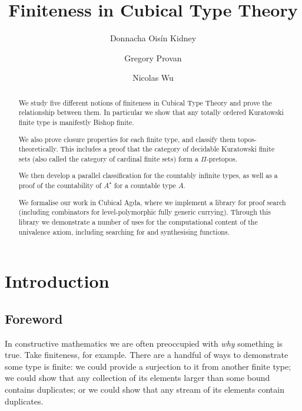 

\author{Donnacha Oisín Kidney}
\author{Gregory Provan}
\author{Nicolas Wu}

\title{Finiteness in Cubical Type Theory}


\begin{abstract}
  We study five different notions of finiteness in Cubical Type Theory and prove
  the relationship between them.
  In particular we show that any totally ordered Kuratowski finite type is
  manifestly Bishop finite.

  We also prove closure properties for each finite type, and classify them
  topos-theoretically.
  This includes a proof that the category of decidable Kuratowski finite sets
  (also called the category of cardinal finite sets) form a \(\Pi\)-pretopos.

  We then develop a parallel classification for the countably infinite types, as
  well as a proof of the countability of \(A^\star\) for a countable type \(A\).

  We formalise our work in Cubical Agda, where we implement a library for proof
  search (including combinators for level-polymorphic fully generic currying).
  Through this library we demonstrate a number of uses for the computational
  content of the univalence axiom, including searching for and synthesising
  functions.
\end{abstract}



\maketitle
\section{Introduction}
\subsection{Foreword}
In constructive mathematics we are often preoccupied with \emph{why} something
is true.
Take finiteness, for example.
There are a handful of ways to demonstrate some type is finite: we could provide
a surjection to it from another finite type; we could show that any collection
of its elements larger than some bound contains duplicates; or we could show
that any stream of its elements contain duplicates.

